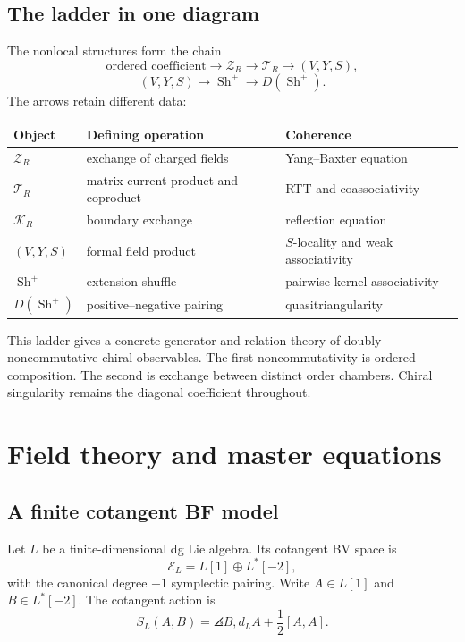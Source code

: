 \chapter{The ladder in one diagram}
The nonlocal structures form the chain
\[
\text{ordered coefficient}
\longrightarrow \mathcal Z_R
\longrightarrow \mathcal T_R
\longrightarrow (V,Y,S),
\]
\[
(V,Y,S)
\longrightarrow \operatorname{Sh}^{+}
\longrightarrow D\!\left(\operatorname{Sh}^{+}\right).
\]
The arrows retain different data:
\begin{center}
\small
\begin{tabularx}{0.96\textwidth}{@{}>{\raggedright\arraybackslash}p{}>{\raggedright\arraybackslash}X>{\raggedright\arraybackslash}p{}@{}}
\toprule
\textbf{Object}&\textbf{Defining operation}&\textbf{Coherence}\\
\midrule
$\mathcal Z_R$&exchange of charged fields&Yang--Baxter equation\\
$\mathcal T_R$&matrix-current product and coproduct&RTT and coassociativity\\
$\mathcal K_R$&boundary exchange&reflection equation\\
$(V,Y,S)$&formal field product&$S$-locality and weak associativity\\
$\operatorname{Sh}^{+}$&extension shuffle&pairwise-kernel associativity\\
$D(\operatorname{Sh}^{+})$&positive--negative pairing&quasitriangularity\\
\bottomrule
\end{tabularx}
\end{center}
This ladder gives a concrete generator-and-relation theory of doubly noncommutative chiral observables.  The first noncommutativity is ordered composition.  The second is exchange between distinct order chambers.  Chiral singularity remains the diagonal coefficient throughout.


\part{Field theory and master equations}

\chapter{A finite cotangent BF model}\label{cywhole:finite-bf}
Let $L$ be a finite-dimensional dg Lie algebra. Its cotangent BV space is
\[
 \mathcal E_L=L[1]\oplus L^*[-2],
\]
with the canonical degree $-1$ symplectic pairing. Write $A\in L[1]$ and $B\in L^*[-2]$. The cotangent action is
\[
 S_L(A,B)=\angles{B,d_LA+\frac12[A,A]}.
\]

